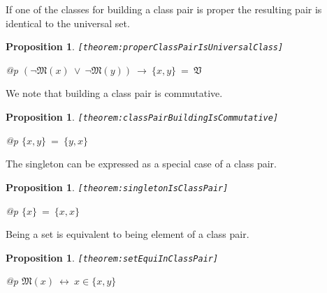 \documentclass[a4paper,german,10pt,twoside]{book}
\newtheorem{prop}[thm]{Proposition}
\theoremstyle{definition}
\theoremstyle{remark}
\begin{document}
\par
If one of the classes for building a class pair is proper the resulting pair
is identical to the universal set.

\begin{prop}
\label{theorem:properClassPairIsUniversalClass} \hypertarget{theorem:properClassPairIsUniversalClass}{}
{\tt \tiny [\verb]theorem:properClassPairIsUniversalClass]]}
\mbox{}
\begin{longtable}{{@{\extracolsep{\fill}}p{\linewidth}}}
\centering $(\neg \mathfrak{M}(x)\ \lor\ \neg \mathfrak{M}(y))\ \rightarrow\ \{ x, y \} \ = \ \mathfrak{V}$
\end{longtable}

\end{prop}


\par
We note that building a class pair is commutative.

\begin{prop}
\label{theorem:classPairBuildingIsCommutative} \hypertarget{theorem:classPairBuildingIsCommutative}{}
{\tt \tiny [\verb]theorem:classPairBuildingIsCommutative]]}
\mbox{}
\begin{longtable}{{@{\extracolsep{\fill}}p{\linewidth}}}
\centering $\{ x, y \} \ = \ \{ y, x \}$
\end{longtable}

\end{prop}


\par
The singleton can be expressed as a special case of a class pair.

\begin{prop}
\label{theorem:singletonIsClassPair} \hypertarget{theorem:singletonIsClassPair}{}
{\tt \tiny [\verb]theorem:singletonIsClassPair]]}
\mbox{}
\begin{longtable}{{@{\extracolsep{\fill}}p{\linewidth}}}
\centering $\{ x \} \ = \ \{ x, x \}$
\end{longtable}

\end{prop}


\par
Being a set is equivalent to being element of a class pair.

\begin{prop}
\label{theorem:setEquiInClassPair} \hypertarget{theorem:setEquiInClassPair}{}
{\tt \tiny [\verb]theorem:setEquiInClassPair]]}
\mbox{}
\begin{longtable}{{@{\extracolsep{\fill}}p{\linewidth}}}
\centering $\mathfrak{M}(x)\ \leftrightarrow\ x \in \{ x, y \}$
\end{longtable}

\end{prop}
\end{document}
